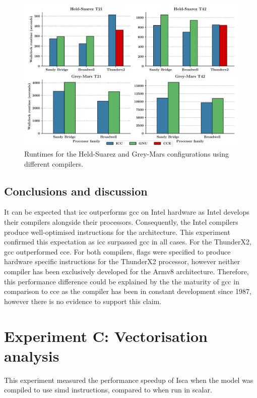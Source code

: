 \documentclass[a4paper,11pt]{report}
\begin{document}
\par
\begin{figure}[htbp]
\begin{center}
\includegraphics[width=1\textwidth]{img/compiler-comparison.pdf}
\caption[Performance comparison using different compilers]{Runtimes for the Held-Suarez and Grey-Mars configurations using different compilers.}
\label{fig:compiler-comparison-t42}
\end{center}
\end{figure}
\subsection{Conclusions and discussion}
It can be expected that \gls{icc} outperforms \gls{gcc} on Intel hardware as Intel develops their compilers alongside their processors. Consequently, the Intel compilers produce well-optimised instructions for the architecture. This experiment confirmed this expectation as \gls{icc} surpassed \gls{gcc} in all cases. For the ThunderX2, \gls{gcc} outperformed \gls{cce}. For both compilers, flags were specified to produce hardware specific instructions for the ThunderX2 processor, however neither compiler has been exclusively developed for the Armv8 architecture. Therefore, this performance difference could be explained by the the maturity of \gls{gcc} in comparison to \gls{cce} as the compiler has been in constant development since 1987, however there is no evidence to support this claim. 


\section{Experiment C: Vectorisation analysis}
This experiment measured the performance speedup of Isca when the model was compiled to use \gls{simd} instructions, compared to when run in scalar.
\end{document}

